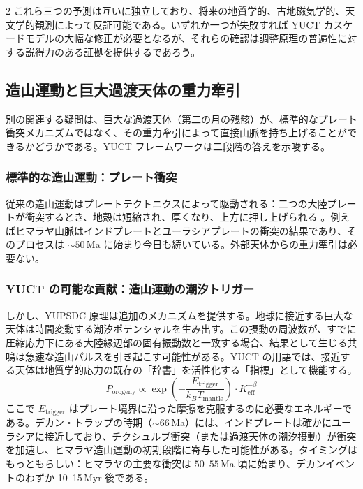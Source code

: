 \documentclass[12pt,a4paper]{article}
\begin{document}
\begin{multicols}{2}
		これら三つの予測は互いに独立しており、将来の地質学的、古地磁気学的、天文学的観測によって反証可能である。いずれか一つが失敗すれば YUCT カスケードモデルの大幅な修正が必要となるが、それらの確認は調整原理の普遍性に対する説得力のある証拠を提供するであろう。
		
		\subsection{造山運動と巨大過渡天体の重力牽引}
		別の関連する疑問は、巨大な過渡天体（第二の月の残骸）が、標準的なプレート衝突メカニズムではなく、その重力牽引によって直接山脈を持ち上げることができるかどうかである。YUCT フレームワークは二段階の答えを示唆する。
		
		\subsubsection{標準的な造山運動：プレート衝突}
		従来の造山運動はプレートテクトニクスによって駆動される：二つの大陸プレートが衝突するとき、地殻は短縮され、厚くなり、上方に押し上げられる \cite{Kearey2013}。例えばヒマラヤ山脈はインドプレートとユーラシアプレートの衝突の結果であり、そのプロセスは \(\sim 50\) Ma に始まり今日も続いている。外部天体からの重力牽引は必要ない。
		
		\subsubsection{YUCT の可能な貢献：造山運動の潮汐トリガー}
		しかし、YUPSDC 原理は追加のメカニズムを提供する。地球に接近する巨大な天体は時間変動する潮汐ポテンシャルを生み出す。この摂動の周波数が、すでに圧縮応力下にある大陸縁辺部の固有振動数と一致する場合、結果として生じる共鳴は急速な造山パルスを引き起こす可能性がある。YUCT の用語では、接近する天体は地質学的応力の既存の「辞書」を活性化する「指標」として機能する。
		\begin{equation}
			P_{\text{orogeny}} \propto \exp\left(-\frac{E_{\text{trigger}}}{k_B T_{\text{mantle}}}\right) \cdot K_{\mathrm{eff}}^{-\beta}
		\end{equation}
		ここで \(E_{\text{trigger}}\) はプレート境界に沿った摩擦を克服するのに必要なエネルギーである。デカン・トラップの時期（\(\sim 66\) Ma）には、インドプレートは確かにユーラシアに接近しており、チクシュルブ衝突（または過渡天体の潮汐摂動）が衝突を加速し、ヒマラヤ造山運動の初期段階に寄与した可能性がある。タイミングはもっともらしい：ヒマラヤの主要な衝突は \(50\)–\(55\) Ma 頃に始まり、デカンイベントのわずか 10–15 Myr 後である。
		

\end{multicols}
\end{document}
